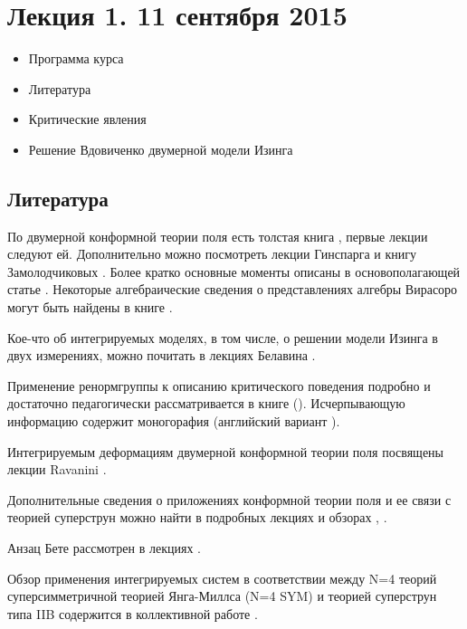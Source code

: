 \documentclass[a4paper,12pt]{article}
\theoremstyle{definition}
\theoremstyle{definition}
\theoremstyle{definition}
\begin{document}
\section{Лекция 1.  11 сентября 2015}
\label{sec:-1}

  \begin{itemize}
  \item Программа курса
  \item Литература
  \item Критические явления
  \item Решение Вдовиченко двумерной модели Изинга
  \end{itemize}

\subsection{Литература}
\label{sec:literature}

По двумерной конформной теории поля есть толстая книга \cite{difrancesco1997cft}, первые лекции
следуют ей. Дополнительно можно посмотреть лекции Гинспарга \cite{Ginsparg:1988ui} и книгу
Замолодчиковых \cite{zamolodchikov1989rus,zamolodchikov1989conformal}. Более кратко основные моменты
описаны в основополагающей статье \cite{belavin1984ics}. Некоторые алгебраические сведения о
представлениях алгебры Вирасоро могут быть найдены в книге \cite{golod2001}.

Кое-что об интегрируемых моделях, в том числе, о решении модели Изинга в двух измерениях, можно
почитать в лекциях Белавина \cite{belavin2001lect}.

Применение ренормгруппы к описанию критического поведения подробно и достаточно педагогически
рассматривается в книге \cite{ma1980} (\cite{ma2000modern}). Исчерпывающую информацию содержит
моногорафия \cite{vasiliev1998} (английский вариант \cite{Vasilev:1027193}). 

Интегрируемым деформациям двумерной конформной теории поля посвящены лекции Ravanini
\cite{Ravanini:2000st}.

Дополнительные сведения о приложениях конформной теории поля и ее связи с теорией суперструн можно
найти в подробных лекциях \cite{springerlink:10.1134/S1063778810050108} и обзорах
\cite{Walton:1999xc}, \cite{gaberdiel2000icf}.

Анзац Бете рассмотрен в лекциях \cite{faddeev1996algebraic}. 

Обзор применения интегрируемых систем в соответствии между N=4 теорий суперсимметричной теорией
Янга-Миллса (N=4 SYM) и теорией суперструн типа IIB содержится в коллективной работе \cite{ReviewAdSCFT}.
\end{document}
